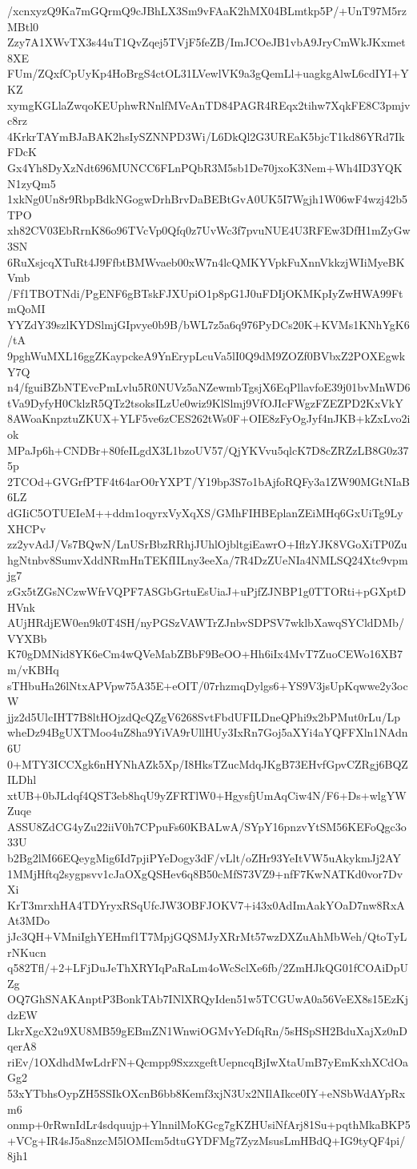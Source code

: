 /xcnxyzQ9Ka7mGQrmQ9cJBhLX3Sm9vFAaK2hMX04BLmtkp5P/+UnT97M5rzMBtl0
Zzy7A1XWvTX3s44uT1QvZqej5TVjF5feZB/ImJCOeJB1vbA9JryCmWkJKxmet8XE
FUm/ZQxfCpUyKp4HoBrgS4ctOL31LVewlVK9a3gQemLl+uagkgAlwL6cdIYI+YKZ
xymgKGLlaZwqoKEUphwRNnlfMVeAnTD84PAGR4REqx2tihw7XqkFE8C3pmjvc8rz
4KrkrTAYmBJaBAK2hsIySZNNPD3Wi/L6DkQl2G3UREaK5bjcT1kd86YRd7IkFDcK
Gx4Yh8DyXzNdt696MUNCC6FLnPQbR3M5sb1De70jxoK3Nem+Wh4ID3YQKN1zyQm5
1xkNg0Un8r9RbpBdkNGogwDrhBrvDaBEBtGvA0UK5I7Wgjh1W06wF4wzj42b5TPO
xh82CV03EbRrnK86o96TVcVp0Qfq0z7UvWc3f7pvuNUE4U3RFEw3DfH1mZyGw3SN
6RuXsjcqXTuRt4J9FfbtBMWvaeb00xW7n4lcQMKYVpkFuXnnVkkzjWIiMyeBKVmb
/Ff1TBOTNdi/PgENF6gBTskFJXUpiO1p8pG1J0uFDIjOKMKpIyZwHWA99FtmQoMI
YYZdY39szlKYDSlmjGIpvye0b9B/bWL7z5a6q976PyDCs20K+KVMs1KNhYgK6/tA
9pghWuMXL16ggZKaypckeA9YnErypLcuVa5lI0Q9dM9ZOZf0BVbxZ2POXEgwkY7Q
n4/fguiBZbNTEvcPmLvlu5R0NUVz5aNZewmbTgsjX6EqPllavfoE39j01bvMnWD6
tVa9DyfyH0CklzR5QTz2tsoksILzUe0wiz9KlSlmj9VfOJIcFWgzFZEZPD2KxVkY
8AWoaKnpztuZKUX+YLF5ve6zCES262tWs0F+OIE8zFyOgJyf4nJKB+kZxLvo2iok
MPaJp6h+CNDBr+80feILgdX3L1bzoUV57/QjYKVvu5qlcK7D8cZRZzLB8G0z375p
2TCOd+GVGrfPTF4t64arO0rYXPT/Y19bp3S7o1bAjfoRQFy3a1ZW90MGtNIaB6LZ
dGIiC5OTUEIeM++ddm1oqyrxVyXqXS/GMhFIHBEplanZEiMHq6GxUiTg9LyXHCPv
zz2yvAdJ/Vs7BQwN/LnUSrBbzRRhjJUhlOjbltgiEawrO+IflzYJK8VGoXiTP0Zu
hgNtnbv8SumvXddNRmHnTEKfIILny3eeXa/7R4DzZUeNIa4NMLSQ24Xtc9vpmjg7
zGx5tZGsNCzwWfrVQPF7ASGbGrtuEsUiaJ+uPjfZJNBP1g0TTORti+pGXptDHVnk
AUjHRdjEW0en9k0T4SH/nyPGSzVAWTrZJnbvSDPSV7wklbXawqSYCldDMb/VYXBb
K70gDMNid8YK6eCm4wQVeMabZBbF9BeOO+Hh6iIx4MvT7ZuoCEWo16XB7m/vKBHq
sTHbuHa26lNtxAPVpw75A35E+eOIT/07rhzmqDylgs6+YS9V3jsUpKqwwe2y3ocW
jjz2d5UlcIHT7B8ltHOjzdQcQZgV6268SvtFbdUFILDneQPhi9x2bPMut0rLu/Lp
wheDz94BgUXTMoo4uZ8ha9YiVA9rUllHUy3IxRn7Goj5aXYi4aYQFFXln1NAdn6U
0+MTY3ICCXgk6nHYNhAZk5Xp/I8HksTZucMdqJKgB73EHvfGpvCZRgj6BQZILDhl
xtUB+0bJLdqf4QST3eb8hqU9yZFRTlW0+HgysfjUmAqCiw4N/F6+Ds+wlgYWZuqe
ASSU8ZdCG4yZu22iiV0h7CPpuFs60KBALwA/SYpY16pnzvYtSM56KEFoQgc3o33U
b2Bg2lM66EQeygMig6Id7pjiPYeDogy3dF/vLlt/oZHr93YeItVW5uAkykmJj2AY
1MMjHftq2sygpsvv1cJaOXgQSHev6q8B50cMfS73VZ9+nfF7KwNATKd0vor7DvXi
KrT3mrxhHA4TDYryxRSqUfcJW3OBFJOKV7+i43x0AdImAakYOaD7nw8RxAAt3MDo
jJc3QH+VMniIghYEHmf1T7MpjGQSMJyXRrMt57wzDXZuAhMbWeh/QtoTyLrNKucn
q582Tfl/+2+LFjDuJeThXRYIqPaRaLm4oWcSclXe6fb/2ZmHJkQG01fCOAiDpUZg
OQ7GhSNAKAnptP3BonkTAb7INlXRQyIden51w5TCGUwA0a56VeEX8s15EzKjdzEW
LkrXgcX2u9XU8MB59gEBmZN1WnwiOGMvYeDfqRn/5sHSpSH2BduXajXz0nDqerA8
riEv/1OXdhdMwLdrFN+Qcmpp9SxzxgeftUepncqBjIwXtaUmB7yEmKxhXCdOaGg2
53xYTbhsOypZH5SSIkOXcnB6bb8Kemf3xjN3Ux2NIlAIkce0IY+eNSbWdAYpRxm6
onmp+0rRwnIdLr4sdquujp+YlnnilMoKGcg7gKZHUsiNfArj81Su+pqthMkaBKP5
+VCg+IR4sJ5a8nzcM5lOMIcm5dtuGYDFMg7ZyzMsusLmHBdQ+IG9tyQF4pi/8jh1
